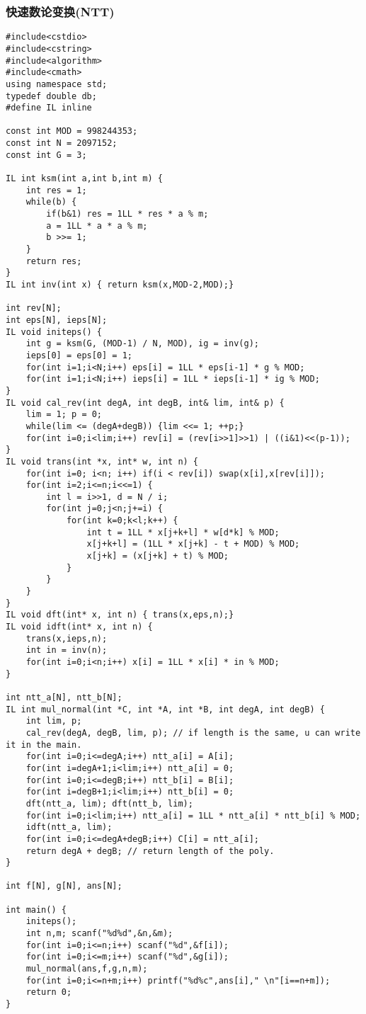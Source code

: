 \documentclass[UTF8]{ctexart}
\begin{document}
\subsubsection{快速数论变换(NTT)}
\begin{framed}
\begin{lstlisting}
#include<cstdio>
#include<cstring>
#include<algorithm>
#include<cmath>
using namespace std;
typedef double db;
#define IL inline

const int MOD = 998244353;
const int N = 2097152;
const int G = 3;

IL int ksm(int a,int b,int m) {
	int res = 1;
	while(b) {
		if(b&1) res = 1LL * res * a % m;
		a = 1LL * a * a % m;
		b >>= 1;
	}
	return res;
}
IL int inv(int x) { return ksm(x,MOD-2,MOD);}

int rev[N];
int eps[N], ieps[N];
IL void initeps() {
	int g = ksm(G, (MOD-1) / N, MOD), ig = inv(g);
	ieps[0] = eps[0] = 1;
	for(int i=1;i<N;i++) eps[i] = 1LL * eps[i-1] * g % MOD;
	for(int i=1;i<N;i++) ieps[i] = 1LL * ieps[i-1] * ig % MOD;
}
IL void cal_rev(int degA, int degB, int& lim, int& p) {
	lim = 1; p = 0;
	while(lim <= (degA+degB)) {lim <<= 1; ++p;}
	for(int i=0;i<lim;i++) rev[i] = (rev[i>>1]>>1) | ((i&1)<<(p-1));
}
IL void trans(int *x, int* w, int n) {
	for(int i=0; i<n; i++) if(i < rev[i]) swap(x[i],x[rev[i]]);
	for(int i=2;i<=n;i<<=1) {
		int l = i>>1, d = N / i;
		for(int j=0;j<n;j+=i) {
			for(int k=0;k<l;k++) {
				int t = 1LL * x[j+k+l] * w[d*k] % MOD;
				x[j+k+l] = (1LL * x[j+k] - t + MOD) % MOD;
				x[j+k] = (x[j+k] + t) % MOD;
			}
		}
	}
}
IL void dft(int* x, int n) { trans(x,eps,n);}
IL void idft(int* x, int n) { 
	trans(x,ieps,n); 
	int in = inv(n);
	for(int i=0;i<n;i++) x[i] = 1LL * x[i] * in % MOD;
}

int ntt_a[N], ntt_b[N];
IL int mul_normal(int *C, int *A, int *B, int degA, int degB) {
	int lim, p;
	cal_rev(degA, degB, lim, p); // if length is the same, u can write it in the main. 
	for(int i=0;i<=degA;i++) ntt_a[i] = A[i];
    for(int i=degA+1;i<lim;i++) ntt_a[i] = 0;
	for(int i=0;i<=degB;i++) ntt_b[i] = B[i];
    for(int i=degB+1;i<lim;i++) ntt_b[i] = 0;
	dft(ntt_a, lim); dft(ntt_b, lim);
	for(int i=0;i<lim;i++) ntt_a[i] = 1LL * ntt_a[i] * ntt_b[i] % MOD;
	idft(ntt_a, lim);
	for(int i=0;i<=degA+degB;i++) C[i] = ntt_a[i];
	return degA + degB; // return length of the poly.
}

int f[N], g[N], ans[N];

int main() {
	initeps();
	int n,m; scanf("%d%d",&n,&m);
	for(int i=0;i<=n;i++) scanf("%d",&f[i]);
	for(int i=0;i<=m;i++) scanf("%d",&g[i]);
	mul_normal(ans,f,g,n,m);
	for(int i=0;i<=n+m;i++) printf("%d%c",ans[i]," \n"[i==n+m]);
	return 0;
} 
\end{lstlisting}
\end{framed}
\end{document}
